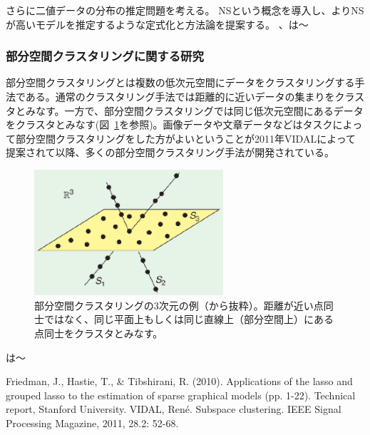 さらに二値データの分布の推定問題を考える。
NSという概念を導入し、よりNSが高いモデルを推定するような定式化と方法論を提案する。
\cite{HSM01}、\cite{HSM02}は〜\\


\subsubsection{部分空間クラスタリングに関する研究}

部分空間クラスタリングとは複数の低次元空間にデータをクラスタリングする手法である。通常のクラスタリング手法では距離的に近いデータの集まりをクラスタとみなす。一方で、部分空間クラスタリングでは同じ低次元空間にあるデータをクラスタとみなす(図~\ref{fig:my_label}を参照)。画像データや文章データなどはタスクによって部分空間クラスタリングをした方がよいということが2011年VIDAL\cite{SC}によって提案されて以降、多くの部分空間クラスタリング手法が開発されている。

\begin{figure}[h]
    \centering
    \includegraphics[width=7cm]{Matsushima/sc.eps}
    \caption{部分空間クラスタリングの3次元の例（\cite{SC}から抜粋）。距離が近い点同士ではなく、同じ平面上もしくは同じ直線上（部分空間上）にある点同士をクラスタとみなす。}
    \label{fig:my_label}
\end{figure}
\cite{NM01}は〜

\begin{thebibliography}{9}
    Friedman, J., Hastie, T., & Tibshirani, R. (2010). 
    Applications of the lasso and grouped lasso to the estimation of sparse graphical models (pp. 1-22). Technical report, Stanford University.
 VIDAL, René. Subspace clustering. IEEE Signal Processing Magazine, 2011, 28.2: 52-68.
\end{thebibliography}

